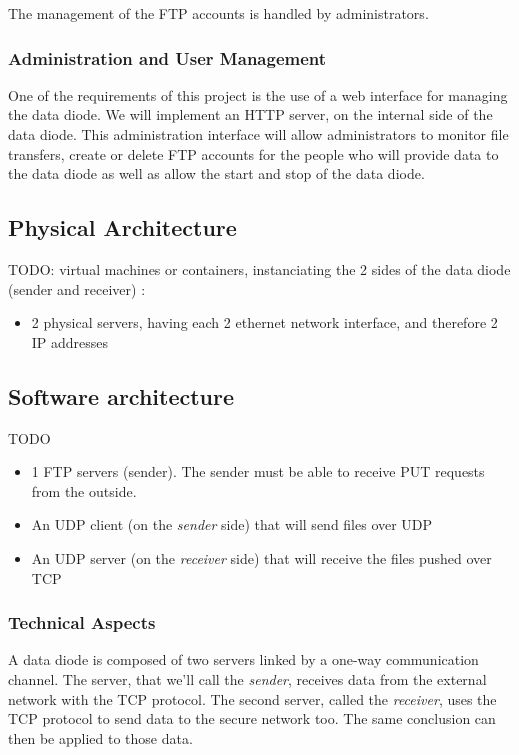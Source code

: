 \documentclass[a4paper,11pt]{article}
\begin{document}
The management of the FTP accounts is handled by administrators.

\subsubsection{Administration and User Management}
One of the requirements of this project is the use of a web interface for managing the data diode. We will implement an HTTP server, on the internal side of the data diode. This administration interface will allow administrators to monitor file transfers, create or delete FTP accounts for the people who will provide data to the data diode as well as allow the start and stop of the data diode.

\subsection{Physical Architecture}
TODO: virtual machines or containers, instanciating the 2 sides of the data diode (sender and receiver) :
\begin{itemize}
\item{2 physical servers, having each 2 ethernet network interface, and therefore 2 IP addresses}

\end{itemize}

\subsection{Software architecture}
TODO
\begin{itemize}
\item{1 FTP servers (sender). The sender must be able to receive PUT requests from the outside.}
\item{An UDP client (on the \textit{sender} side) that will send files over UDP}
\item{An UDP server (on the \textit{receiver }side)} that will receive the files pushed over TCP
\end{itemize}
\subsubsection{Technical Aspects}
A data diode is composed of two servers linked by a one-way communication channel. The server, that we'll call the \textit{sender}, receives data from the external network with the TCP protocol. The second server, called the \textit{receiver}, uses the TCP protocol to send data to the secure network too. The same conclusion can then be applied to those data.\\
\end{document}
